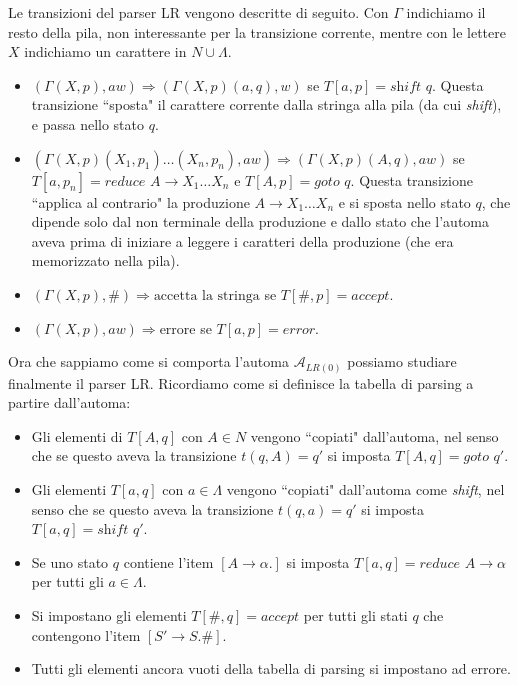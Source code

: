 \documentclass[12pt]{article}
\numberwithin{theorem}{subsection}
\begin{document}
Le transizioni del parser LR vengono descritte di seguito. Con $\Gamma$ indichiamo il resto della pila, non interessante per la transizione corrente, mentre con le lettere $X$ indichiamo un carattere in $N \cup \Lambda$.
\begin{itemize}
	\item $(\Gamma (X, p), a w) \Rightarrow ( \Gamma (X, p) (a, q), w)$ se $T[a, p] = \textit{shift }q$. Questa transizione ``sposta" il carattere corrente dalla stringa alla pila (da cui \textit{shift}), e passa nello stato $q$.
	\item $(\Gamma (X, p) (X_1, p_1) \dots (X_n, p_n), a w) \Rightarrow ( \Gamma (X, p) (A, q), a w)$ se $T[a, p_n] = \textit{reduce }A \rightarrow X_1 \dots X_n$ e $T[A, p] = \textit{goto }q$. Questa transizione ``applica al contrario" la produzione $A \rightarrow X_1 \dots X_n$ e si sposta nello stato $q$, che dipende solo dal non terminale della produzione e dallo stato che l'automa aveva prima di iniziare a leggere i caratteri della produzione (che era memorizzato nella pila).
	\item $(\Gamma (X, p), \#) \Rightarrow \text{accetta la stringa}$ se $T[\#, p] = \textit{accept}$.
	\item $(\Gamma (X, p), a w) \Rightarrow \text{errore}$ se $T[a, p] = \textit{error}$.
\end{itemize}

Ora che sappiamo come si comporta l'automa $\mathcal{A}_{LR(0)}$ possiamo studiare finalmente il parser LR. Ricordiamo come si definisce la tabella di parsing a partire dall'automa:
\begin{itemize}
	\item Gli elementi di $T[A, q]$ con $A \in N$ vengono ``copiati" dall'automa, nel senso che se questo aveva la transizione $t(q, A) = q'$ si imposta $T[A, q] = \textit{goto } q'$.
	\item Gli elementi $T[a, q]$ con $a \in \Lambda$ vengono ``copiati" dall'automa come \textit{shift}, nel senso che se questo aveva la transizione $t(q, a) = q'$ si imposta $T[a, q] = \textit{shift } q'$.
	\item Se uno stato $q$ contiene l'item $[ A \rightarrow \alpha . ]$ si imposta $T[a, q] = \textit{reduce } A \rightarrow \alpha$ per tutti gli $a \in \Lambda$.
	\item Si impostano gli elementi $T[\#, q] = \textit{accept}$ per tutti gli stati $q$ che contengono l'item $[ S' \rightarrow S. \# ]$.
	\item Tutti gli elementi ancora vuoti della tabella di parsing si impostano ad errore.
\end{itemize}
\end{document}
